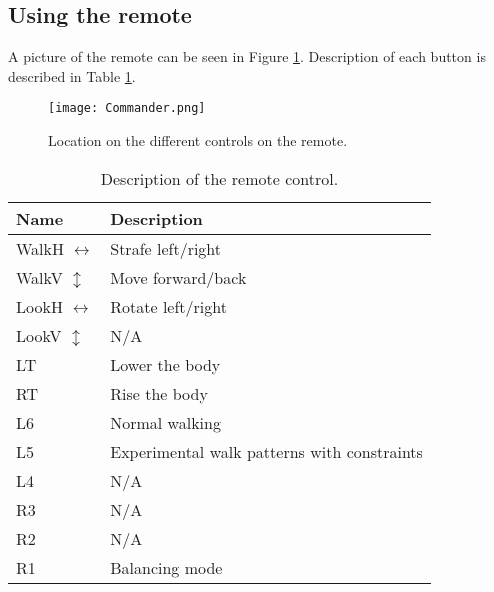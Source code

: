 \newpage
\subsection{Using the remote}

A picture of the remote can be seen in Figure \ref{fig:commander}.
Description of each button is described in Table \ref{tab:remotecontroll}.



\begin{figure}[h!]%
\centering%
\texttt{[image: Commander.png]}%
\caption{Location on the different controls on the remote.}%
\label{fig:commander}%
\end{figure}


\setlength{\extrarowheight}{5pt}
\begin{table}[h!]
\centering%
\begin{tabular}{|l|l|}
\hline Name 					&   Description			\\ 
\hline WalkH $\leftrightarrow$	& 	Strafe left/right	\\ 
\hline WalkV $\updownarrow$ 	&   Move forward/back 	\\ 
\hline LookH $\leftrightarrow$	& 	Rotate left/right 	\\  
\hline LookV $\updownarrow$		&   N/A					\\ 
\hline LT&      Lower the body		\\
\hline RT& 	    Rise the body		\\  
\hline L6&      Normal walking		\\ 
\hline L5&      Experimental walk patterns with constraints\\
\hline L4&      N/A					\\
\hline R3& 	    N/A					\\  
\hline R2&      N/A					\\ 
\hline R1&      Balancing mode    	\\
\hline 
\end{tabular} 
\caption{Description of the remote control.}%
\label{tab:remotecontroll}%
\end{table}



